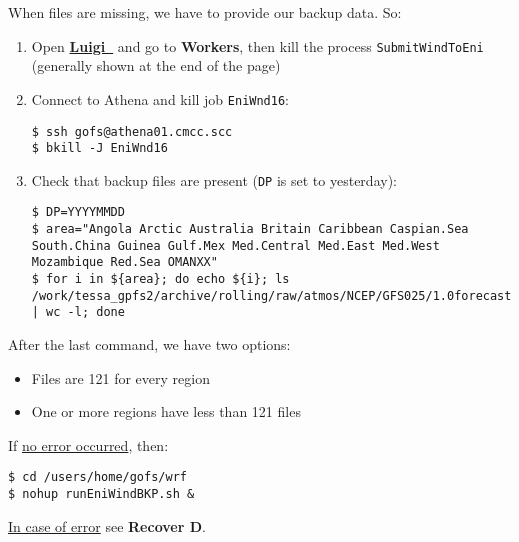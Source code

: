 \documentclass[twocolumn,8pt]{article}
\begin{document}
\begin{mdframed}[frametitle=(Recover C)\ -- Before 11 am]

When files are missing, we have to provide our backup data. So:

\begin{enumerate}\itemsep0pt
    \item Open \href{http://athena01.cmcc.scc:58082/static/visualiser/index.html#}{\textbf{Luigi\ \faExternalLink}} and go to \textbf{Workers}, then kill the process \texttt{SubmitWindToEni} (generally shown at the end of the page)
    
    \item Connect to Athena and kill job \texttt{EniWnd16}:
    \begin{lstlisting}
$ ssh gofs@athena01.cmcc.scc
$ bkill -J EniWnd16
    \end{lstlisting}
    
    \item Check that backup files are present (\texttt{DP} is set to yesterday):
    \begin{lstlisting}[breaklines=true,showstringspaces=false]
$ DP=YYYYMMDD
$ area="Angola Arctic Australia Britain Caribbean Caspian.Sea South.China Guinea Gulf.Mex Med.Central Med.East Med.West Mozambique Red.Sea OMANXX"
$ for i in ${area}; do echo ${i}; ls  /work/tessa_gpfs2/archive/rolling/raw/atmos/NCEP/GFS025/1.0forecast/6h/${DP}/backup/${i}_1.16_*.grib | wc -l; done
    \end{lstlisting}
\end{enumerate}

After the last command, we have two options:
\begin{itemize}\itemsep0pt
    \item[{\textcolor{ForestGreen}{\faCheckCircle}}] Files are 121 for every region
    \item[{\textcolor{Red}{\faTimesCircle}}] One or more regions have less than 121 files
\end{itemize}

If \ul{no error occurred}, then:
\begin{lstlisting}
$ cd /users/home/gofs/wrf
$ nohup runEniWindBKP.sh &
\end{lstlisting}

\ul{In case of error} see \textbf{Recover D}.

\end{mdframed}
\end{document}
